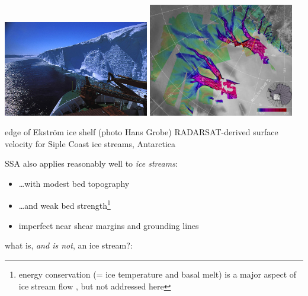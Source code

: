 \documentclass[titlepage,letterpaper,final,12pt]{scrartcl}
\newcommand{\alert}[1]{\emph{#1}}
\begin{document}
\begin{center}
\includegraphics[width=2.5in]{ice_shelf_edge_hg}
\quad
\includegraphics[width=2.5in]{siple}

edge of Ekstr\"om ice shelf (photo Hans Grobe) \qquad RADARSAT-derived surface velocity for Siple Coast ice streams, Antarctica
\end{center}

SSA also applies reasonably well to \alert{ice streams}:
\begin{itemize}
\item \dots with modest bed topography
\item \dots and weak bed strength\footnote{energy conservation (= ice temperature and basal melt) is a major aspect of ice stream flow \cite{Raymondenergy}, but not addressed here}
\item imperfect near shear margins and grounding lines
\end{itemize}


what is, \emph{and is not}, an ice stream?:
\end{document}
